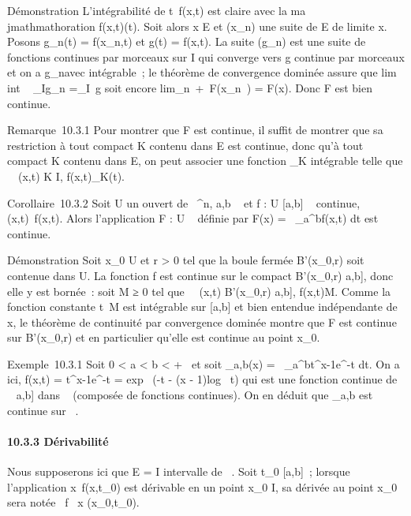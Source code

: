 \documentclass[]{article}
\begin{document}
Démonstration L'intégrabilité de t\mapsto~f(x,t) est
claire avec la ma\\jmathmathoration f(x,t)\leq \phi(t). Soit alors x
\in E et (x_n) une suite de E de limite x. Posons g_n(t)
= f(x_n,t) et g(t) = f(x,t). La suite (g_n) est une
suite de fonctions continues par morceaux sur I qui converge vers g
continue par morceaux et on a g_n\leq \phi avec \phi
intégrable~; le théorème de convergence dominée assure que
lim\\int ~
_Ig_n =\int  _I~g soit
encore lim_n\rightarrow~+\infty~F(x_n~) =
F(x). Donc F est bien continue.

Remarque~10.3.1 Pour montrer que F est continue, il suffit de montrer
que sa restriction à tout compact K contenu dans E est continue, donc
qu'à tout compact K contenu dans E, on peut associer une fonction
\phi_K intégrable telle que \forall~~(x,t) \in K \times
I, f(x,t)\leq \phi_K(t).

Corollaire~10.3.2 Soit U un ouvert de ~^n, a,b \in {}~ et f : U \times
{[}a,b{]} \rightarrow~  continue, (x,t)\mapsto~f(x,t). Alors
l'application F : U \rightarrow~  définie par F(x) =\int ~
_a^bf(x,t) dt est continue.

Démonstration Soit x_0 \in U et r \textgreater{} 0 tel que la
boule fermée B'(x_0,r) soit contenue dans U. La fonction f est
continue sur le compact B'(x_0,r) \times {[}a,b{]}, donc elle y est
bornée~: soit M ≥ 0 tel que \forall~~(x,t) \in
B'(x_0,r) \times {[}a,b{]}, f(x,t)\leq M. Comme la
fonction constante t\mapsto~M est intégrable sur
{[}a,b{]} et bien entendue indépendante de x, le théorème de continuité
par convergence dominée montre que F est continue sur B'(x_0,r)
et en particulier qu'elle est continue au point x_0.

Exemple~10.3.1 Soit 0 \textless{} a \textless{} b \textless{} +\infty~ et soit
\Gamma_a,b(x) =\int ~
_a^bt^x-1e^-t dt. On a ici, f(x,t) =
t^x-1e^-t = exp~ (-t - (x
- 1)log~ t) qui est une fonction continue de ~
\times {[}a,b{]} dans ~ (composée de fonctions continues). On en déduit que
\Gamma_a,b est continue sur ~.

\paragraph{10.3.3 Dérivabilité}

Nous supposerons ici que E = I intervalle de ~. Soit t_0 \in
{[}a,b{]}~; lorsque l'application
x\mapsto~f(x,t_0) est dérivable en un point
x_0 \in I, sa dérivée au point x_0 sera notée  \partial~f
\over \partial~x (x_0,t_0).
\end{document}
